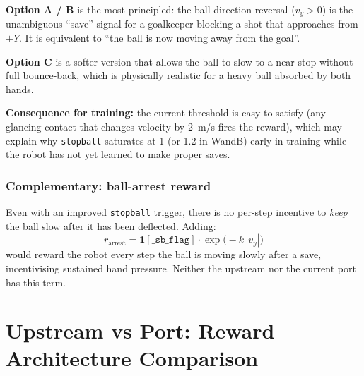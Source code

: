 \documentclass[11pt,a4paper]{article}
\begin{document}
\textbf{Option A / B} is the most principled: the ball direction reversal
($v_y > 0$) is the unambiguous ``save'' signal for a goalkeeper blocking a shot
that approaches from $+Y$. It is equivalent to ``the ball is now moving away
from the goal''.

\textbf{Option C} is a softer version that allows the ball to slow to a
near-stop without full bounce-back, which is physically realistic for a heavy
ball absorbed by both hands.

\textbf{Consequence for training:} the current threshold is easy to satisfy
(any glancing contact that changes velocity by 2~m/s fires the reward), which
may explain why \texttt{stopball} saturates at 1 (or 1.2 in WandB) early in
training while the robot has not yet learned to make proper saves.

\subsubsection{Complementary: ball-arrest reward}

Even with an improved \texttt{stopball} trigger, there is no per-step incentive
to \emph{keep} the ball slow after it has been deflected. Adding:
\[
r_\text{arrest} = \mathbf{1}[\texttt{\_sb\_flag}] \cdot \exp\!\bigl(-k\,|v_y|\bigr)
\]
would reward the robot every step the ball is moving slowly after a save,
incentivising sustained hand pressure. Neither the upstream nor the current
port has this term.

\section{Upstream vs Port: Reward Architecture Comparison}
\label{sec:arch}
\end{document}
